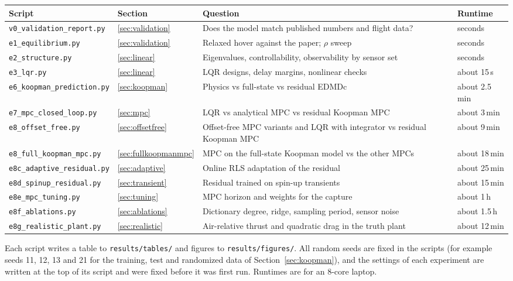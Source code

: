 \begin{table}[h]
\centering\small
\begin{tabularx}{\linewidth}{l l L l}
\toprule
Script & Section & Question & Runtime \\
\midrule
\texttt{v0\_validation\_report.py} & \ref{sec:validation} & Does the model match published numbers and flight data? & seconds \\
\texttt{e1\_equilibrium.py} & \ref{sec:validation} & Relaxed hover against the paper; $\rho$ sweep & seconds \\
\texttt{e2\_structure.py} & \ref{sec:linear} & Eigenvalues, controllability, observability by sensor set & seconds \\
\texttt{e3\_lqr.py} & \ref{sec:linear} & LQR designs, delay margins, nonlinear checks & about 15\,s \\
\texttt{e6\_koopman\_prediction.py} & \ref{sec:koopman} & Physics vs full-state vs residual EDMDc & about 2.5\,min \\
\texttt{e7\_mpc\_closed\_loop.py} & \ref{sec:mpc} & LQR vs analytical MPC vs residual Koopman MPC & about 3\,min \\
\texttt{e8\_offset\_free.py} & \ref{sec:offsetfree} & Offset-free MPC variants and LQR with integrator vs residual Koopman MPC & about 9\,min \\
\texttt{e8\_full\_koopman\_mpc.py} & \ref{sec:fullkoopmanmpc} & MPC on the full-state Koopman model vs the other MPCs & about 18\,min \\
\texttt{e8c\_adaptive\_residual.py} & \ref{sec:adaptive} & Online RLS adaptation of the residual & about 25\,min \\
\texttt{e8d\_spinup\_residual.py} & \ref{sec:transient} & Residual trained on spin-up transients & about 15\,min \\
\texttt{e8e\_mpc\_tuning.py} & \ref{sec:tuning} & MPC horizon and weights for the capture & about 1\,h \\
\texttt{e8f\_ablations.py} & \ref{sec:ablations} & Dictionary degree, ridge, sampling period, sensor noise & about 1.5\,h \\
\texttt{e8g\_realistic\_plant.py} & \ref{sec:realistic} & Air-relative thrust and quadratic drag in the truth plant & about 12\,min \\
\bottomrule
\end{tabularx}
\end{table}
Each script writes a table to \texttt{results/tables/} and figures to \texttt{results/figures/}. All random seeds are fixed in the scripts (for example seeds 11, 12, 13 and 21 for the training, test and randomized data of Section~\ref{sec:koopman}), and the settings of each experiment are written at the top of its script and were fixed before it was first run. Runtimes are for an 8-core laptop.
